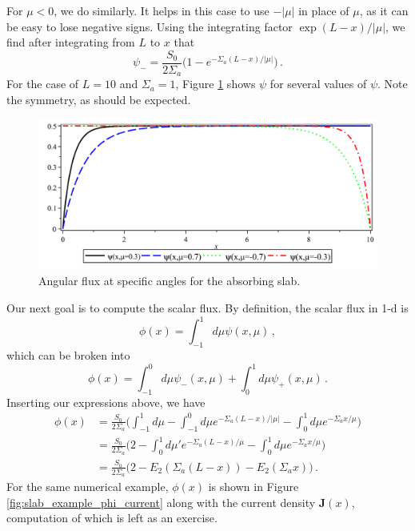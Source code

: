 For $\mu<0$, we do similarly.  It helps in this case to use $-|\mu|$ in place of $\mu$, as it can be easy to lose negative signs.  Using the integrating factor $\exp{(L-x)/|\mu|}$, we find after integrating from $L$ to $x$ that
\begin{equation}
 \psi_{-} = \frac{S_0}{2\Sigma_a}\Bigg (1 - e^{-\Sigma_a (L-x)/|\mu|} \Bigg ) \, .
\end{equation}
For the case of $L = 10$ and $\Sigma_a = 1$, Figure \ref{fig:slab_example_psi} shows $\psi$ for several values of $\psi$.  Note the symmetry, as should be expected. 

\begin{figure}[ht] 
    \centering
    \includegraphics[keepaspectratio, width = 5.0 in]{images/slab_example_psi}
    \caption{Angular flux at specific angles for the absorbing slab.}
    \label{fig:slab_example_psi}
\end{figure}

Our next goal is to compute the scalar flux.  By definition, the scalar flux in 1-d is
\begin{equation}
 \phi(x) = \int^1_{-1} d\mu \psi(x,\mu) \, ,
\end{equation}
which can be broken into
\begin{equation}
  \phi(x) = \int^0_{-1} d\mu \psi_{-}(x,\mu) + \int^1_{0} d\mu \psi_{+}(x,\mu) \, .
\end{equation}
Inserting our expressions above, we have
\begin{equation}
\begin{split}
  \phi(x) &= \frac{S_0}{2\Sigma_a} \Bigg (  \int^{1}_{-1} d\mu - \int^0_{-1} d\mu  e^{-\Sigma_a (L-x)/|\mu|} - \int^1_{0} d\mu e^{-\Sigma_a x/\mu}  \Bigg ) \\
          &= \frac{S_0}{2\Sigma_a} \Bigg ( 2 - \int^1_{0} d\mu'  e^{-\Sigma_a (L-x)/\mu} - \int^1_{0} d\mu e^{-\Sigma_a x/\mu}  \Bigg ) \\
          &= \frac{S_0}{2\Sigma_a} \Bigg ( 2 - E_2(\Sigma_a (L-x)) - E_2(\Sigma_a x)  \Bigg ) \, .
\end{split}
\end{equation}
For the same numerical example, $\phi(x)$ is shown in Figure \ref{fig:slab_example_phi_current} along with the current density $\mathbf{J}(x)$, computation of which is left as an exercise.

